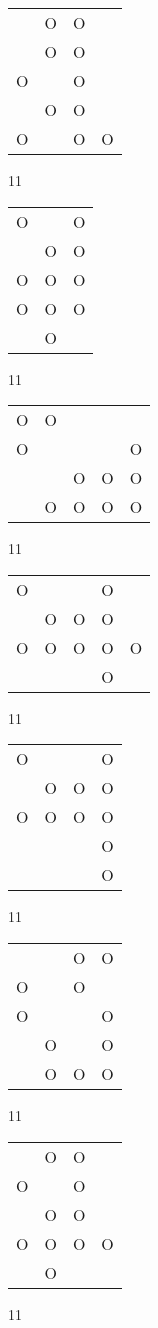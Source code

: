 \begin{tabular}{|m{0.2cm}m{0.2cm}m{0.2cm}m{0.2cm}|}\hline
 &O&O& \\
 &O&O& \\
O& &O& \\
 &O&O& \\
O& &O&O\\
\hline\end{tabular}11
\begin{tabular}{|m{0.2cm}m{0.2cm}m{0.2cm}|}\hline
O& &O\\
 &O&O\\
O&O&O\\
O&O&O\\
 &O& \\
\hline\end{tabular}11
\begin{tabular}{|m{0.2cm}m{0.2cm}m{0.2cm}m{0.2cm}m{0.2cm}|}\hline
O&O& & & \\
O& & & &O\\
 & &O&O&O\\
 &O&O&O&O\\
\hline\end{tabular}11
\begin{tabular}{|m{0.2cm}m{0.2cm}m{0.2cm}m{0.2cm}m{0.2cm}|}\hline
O& & &O& \\
 &O&O&O& \\
O&O&O&O&O\\
 & & &O& \\
\hline\end{tabular}11
\begin{tabular}{|m{0.2cm}m{0.2cm}m{0.2cm}m{0.2cm}|}\hline
O& & &O\\
 &O&O&O\\
O&O&O&O\\
 & & &O\\
 & & &O\\
\hline\end{tabular}11
\begin{tabular}{|m{0.2cm}m{0.2cm}m{0.2cm}m{0.2cm}|}\hline
 & &O&O\\
O& &O& \\
O& & &O\\
 &O& &O\\
 &O&O&O\\
\hline\end{tabular}11
\begin{tabular}{|m{0.2cm}m{0.2cm}m{0.2cm}m{0.2cm}|}\hline
 &O&O& \\
O& &O& \\
 &O&O& \\
O&O&O&O\\
 &O& & \\
\hline\end{tabular}11
